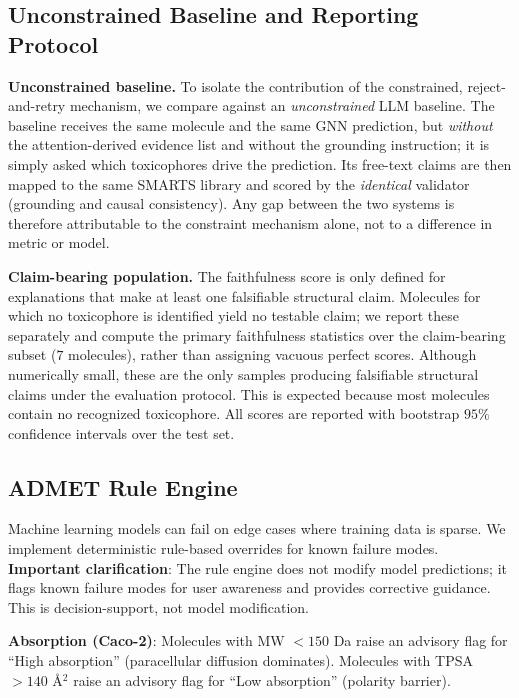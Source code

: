 \documentclass[conference]{IEEEtran}
\newcommand{\NwithClaims}{7}    %
\begin{document}
\subsection{Unconstrained Baseline and Reporting Protocol}

\textbf{Unconstrained baseline.} To isolate the contribution of the constrained, reject-and-retry mechanism, we compare against an \emph{unconstrained} LLM baseline. The baseline receives the same molecule and the same GNN prediction, but \emph{without} the attention-derived evidence list and without the grounding instruction; it is simply asked which toxicophores drive the prediction. Its free-text claims are then mapped to the same SMARTS library and scored by the \emph{identical} validator (grounding and causal consistency). Any gap between the two systems is therefore attributable to the constraint mechanism alone, not to a difference in metric or model.

\textbf{Claim-bearing population.} The faithfulness score is only defined for explanations that make at least one falsifiable structural claim. Molecules for which no toxicophore is identified yield no testable claim; we report these separately and compute the primary faithfulness statistics over the claim-bearing subset ($\NwithClaims{}$ molecules), rather than assigning vacuous perfect scores. Although numerically small, these are the only samples producing falsifiable structural claims under the evaluation protocol. This is expected because most molecules contain no recognized toxicophore. All scores are reported with bootstrap $95\%$ confidence intervals over the test set.

\subsection{ADMET Rule Engine}

Machine learning models can fail on edge cases where training data is sparse. We implement deterministic rule-based overrides for known failure modes. \textbf{Important clarification}: The rule engine does not modify model predictions; it flags known failure modes for user awareness and provides corrective guidance. This is decision-support, not model modification.

\textbf{Absorption (Caco-2)}: Molecules with MW $< 150$ Da raise an advisory flag for ``High absorption'' (paracellular diffusion dominates). Molecules with TPSA $> 140$ \AA$^2$ raise an advisory flag for ``Low absorption'' (polarity barrier).
\end{document}
